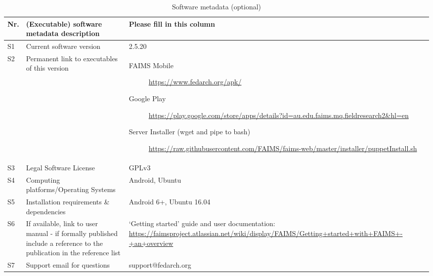 \documentclass[preprint,12pt, a4paper]{elsarticle}
\begin{document}
\begin{table}[!h]
\begin{tabular}{|l|p{6.5cm}|p{6.5cm}|}
\hline
\textbf{Nr.} & \textbf{(Executable) software metadata description} & \textbf{Please fill in this column} \\
\hline
S1 & Current software version & 2.5.20 \\
\hline
S2 & Permanent link to executables of this version  & \begin{description} \item [FAIMS Mobile]\url{https://www.fedarch.org/apk/}
\item [Google Play] \url{https://play.google.com/store/apps/details?id=au.edu.faims.mq.fieldresearch2&hl=en}
\item [Server Installer (wget and pipe to bash)] \url{https://raw.githubusercontent.com/FAIMS/faims-web/master/installer/puppetInstall.sh} \end{description}\\

\hline
S3 & Legal Software License & GPLv3 \\
\hline
S4 & Computing platforms/Operating Systems & Android, Ubuntu \\
\hline
S5 & Installation requirements \& dependencies & Android 6+, Ubuntu 16.04 \\
\hline
S6 & If available, link to user manual - if formally published include a reference to the publication in the reference list & `Getting started' guide and user documentation:
\url{https://faimsproject.atlassian.net/wiki/display/FAIMS/Getting+started+with+FAIMS+-+an+overview} \\
\hline
S7 & Support email for questions & support@fedarch.org\\
\hline
\end{tabular}
\caption{Software metadata (optional)}

\end{table}
\end{document}
